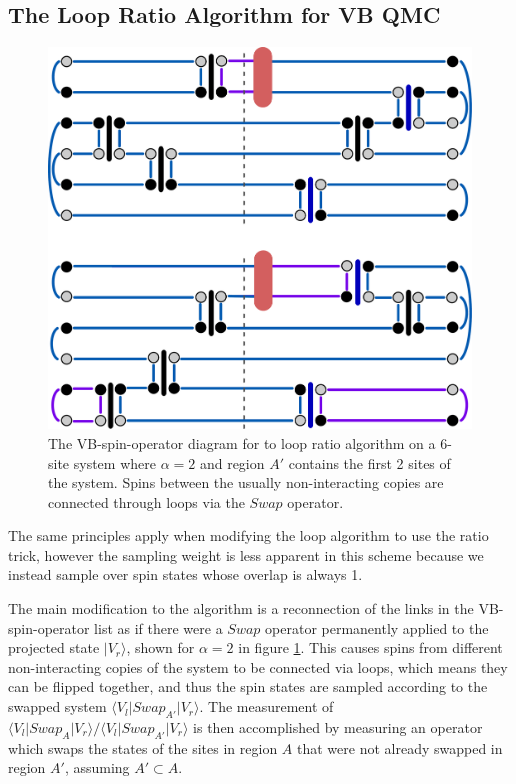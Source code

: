 \documentclass[prb,aps,twocolumn,floatfix,amsmath,amssymb,superscriptaddress,tightenlines]{revtex4}
\begin{document}




\subsection{The Loop Ratio Algorithm for VB QMC}

\begin{figure} {
\includegraphics[width=3.2 in]{loopalgratio.pdf} \caption{ 
\label{lratio} %
The VB-spin-operator diagram for to loop ratio algorithm on a 6-site system where $\alpha =2$ and region $A'$ contains the first 2 sites of the system.
Spins between the usually non-interacting copies are connected through loops via the $Swap$ operator.
}
} \end{figure}

The same principles apply when modifying the loop algorithm to use the ratio trick, however the sampling weight is less apparent in this scheme because we instead sample over spin states whose overlap is always 1.

The main modification to the algorithm is a reconnection of the links in the VB-spin-operator list as if there were a $Swap$ operator permanently applied to the projected state $\lvert V_r \rangle$, shown for $\alpha = 2$ in figure \ref{lratio}.
This causes spins from different non-interacting copies of the system to be connected via loops, which means they can be flipped together, and thus the spin states are sampled according to the swapped system $\langle V_l  \lvert Swap_{A'} \lvert V_r\rangle$.
The measurement of  $\langle V_l  \lvert Swap_{A} \lvert V_r\rangle/\langle V_l  \lvert Swap_{A'} \lvert V_r\rangle$ is then accomplished by measuring an operator which swaps the states of the sites in region $A$ that were not already swapped in region $A'$, assuming $A' \subset A$.
\end{document}
